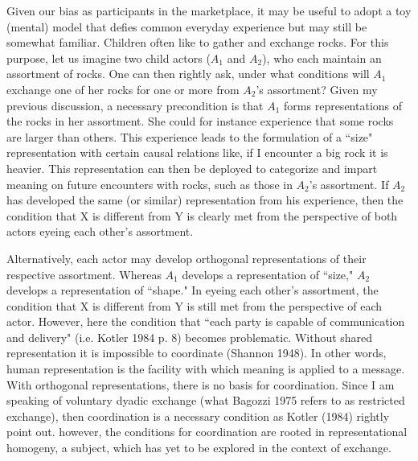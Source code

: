 Given our bias as participants in the marketplace, it may be useful to adopt a toy (mental) model that defies common everyday experience but may still be somewhat familiar. Children often like to gather and exchange rocks. For this purpose, let us imagine two child actors ($A_1$ and $A_2$), who each maintain an assortment of rocks. One can then rightly ask, under what conditions will $A_1$ exchange one of her rocks for one or more from $A_2$'s assortment? Given my previous discussion, a necessary precondition is that $A_1$ forms representations of the rocks in her assortment. She could for instance experience that some rocks are larger than others. This experience leads to the formulation of a ``size" representation with certain causal relations like, if I encounter a big rock it is heavier. This representation can then be deployed to categorize and impart meaning on future encounters with rocks, such as those in $A_2$'s assortment. If $A_2$ has developed the same (or similar) representation from his experience, then the condition that X is different from Y is clearly met from the perspective of both actors eyeing each other's assortment.

Alternatively, each actor may develop orthogonal representations of their respective assortment. Whereas $A_1$ develops a representation of ``size," $A_2$ develops a representation of ``shape." In eyeing each other's assortment, the condition that X is different from Y is still met from the perspective of each actor. However, here the condition that ``each party is capable of communication and delivery" (i.e. Kotler 1984 p. 8) becomes problematic. Without shared representation it is impossible to coordinate (Shannon 1948). In other words, human representation is the facility with which meaning is applied to a message. With orthogonal representations, there is no basis for coordination. Since I am speaking of voluntary dyadic exchange (what Bagozzi 1975 refers to as restricted exchange), then coordination is a necessary condition as Kotler (1984) rightly point out. however, the conditions for coordination are rooted in representational homogeny, a subject, which has yet to be explored in the context of exchange.

